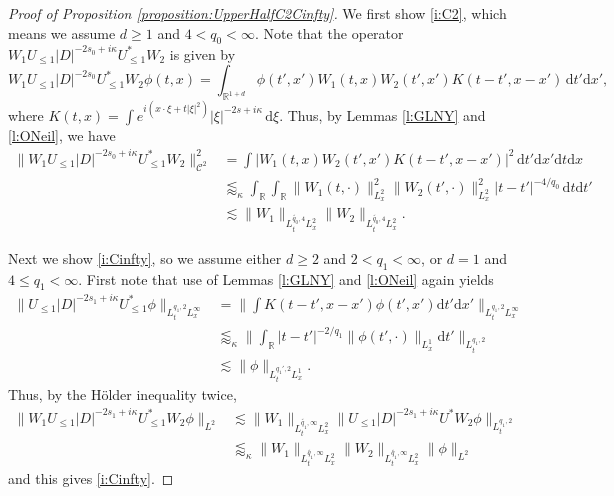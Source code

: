 \documentclass[a4paper]{amsart}
\numberwithin{equation}{section}%
\theoremstyle{plain}%
\theoremstyle{definition}
\theoremstyle{remark}%
\def\d{\mathrm{d}}
\def\C{\mathcal{C}}
\def\C{\mathcal{C}}
\begin{document}
\begin{proof}[Proof of Proposition \ref{proposition:UpperHalfC2Cinfty}]
We first show \eqref{i:C2}, which means we assume $d \geq 1$ and $4 < q_0 < \infty$. Note that the operator $W_1U_{\leq 1}|D|^{-2s_0 + i\kappa}U_{\leq 1}^*W_2$ is given by
\[
W_1U_{\leq 1}|D|^{-2s_0}U_{\leq 1}^*W_2\phi(t,x) 
= 
\int_{\mathbb R^{1+d}}\phi(t',x')W_1(t,x)W_2(t',x')K(t-t',x-x')\,\d t'\d x',
\]
where $K(t,x)=\int e^{i(x \cdot\xi+t|\xi|^2)}|\xi|^{-2s+ i \kappa}\,\d\xi$.
Thus, by Lemmas \ref{l:GLNY} and \ref{l:ONeil}, we have
\begin{align*}
\|W_1U_{\leq 1}|D|^{-2s_0 + i\kappa}U_{\leq 1}^*W_2\|_{\C^2}^2 
& = \int 
\bigl| W_1(t,x)W_2(t',x')K(t-t',x-x') 
\bigr|^2 \,\d t'\d x' \d t \d x \\
& \lessapprox_\kappa
\int_{\mathbb R}\int_{\mathbb R}
\|W_1(t,\cdot)\|_{L_x^2}^2 \|W_2(t',\cdot)\|_{L_x^2}^2|t-t'|^{-4/q_0}\,\d t\d t'\\
& \lesssim \|W_1\|_{L_t^{\widetilde{q_0},4}L_x^2}\|W_2\|_{L_t^{\widetilde{q_0},4}L_x^2}.
\end{align*}


Next we show \eqref{i:Cinfty}, so we assume either $d \geq 2$ and $2 < q_1 < \infty$, or $d = 1$ and $4 \leq q_1 < \infty$. First note that use of Lemmas \ref{l:GLNY} and \ref{l:ONeil} again yields
\begin{align*}
\|U_{\leq 1}|D|^{-2s_1+i\kappa}U_{\leq 1}^* \phi\|_{L_t^{q_1, 2} L_x^{\infty}} 
& = \bigg\| \int K(t-t',x-x') \phi(t',x') \d t' \d x' \bigg\|_{L_t^{q_1, 2} L_x^{\infty}}\\
& \lessapprox_\kappa  \bigg\| \int_{\mathbb R} |t-t'|^{-2/q_1} \| \phi(t', \cdot)\|_{L_x^1} \d t' \bigg\|_{L_t^{q_1, 2}}\\
& \lesssim \|\phi \|_{L_t^{q_1',2}L_x^1}.
\end{align*}
Thus, by the H\"{o}lder inequality twice,
\begin{align*}
\|W_1U_{\leq 1}|D|^{-2s_1+i\kappa}U_{\leq 1}^*W_2 \phi\|_{L^2}
& \lesssim\|W_1\|_{L_t^{\widetilde{q_1},\infty}L_x^2} \|U_{\leq 1}|D|^{-2s_1+i\kappa}U^* W_2 \phi\|_{L_t^{q_1, 2}} \\
& \lessapprox_\kappa
\|W_1\|_{L_t^{\widetilde{q_1},\infty}L_x^2}\|W_2\|_{L_t^{\widetilde{q_1},\infty}L_x^2} \|\phi\|_{L^2}
\end{align*}
and this gives \eqref{i:Cinfty}.
\end{proof}




\end{document}
